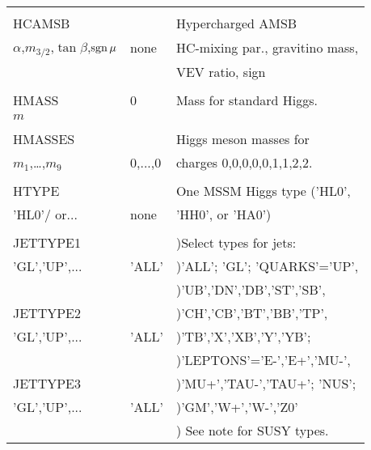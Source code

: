 \begin{center}
\begin{tabular}{lll}
                       &                   &                                \\
HCAMSB                 &                   & Hypercharged AMSB              \\
$\alpha$,$m_{3/2}$,$\tan\beta$,$\mathop{\rm sgn}\mu$ & none & HC-mixing par., gravitino mass, \\
                       &                   & VEV ratio, sign                \\
                       &                   &                                \\
HMASS                  & 0                 & Mass for standard Higgs.       \\
$m$                    &                   &                                \\
                       &                   &                                \\
HMASSES                &                   & Higgs meson masses for         \\
$m_1$,\dots,$m_9$      & 0,...,0           & charges 0,0,0,0,0,1,1,2,2.     \\
                       &                   &                                \\
HTYPE                  &                   & One MSSM Higgs type ('HL0',    \\
'HL0'/ or...           & none              & 'HH0', or 'HA0')               \\
                       &                   &                                \\
JETTYPE1               &                   & )Select types for jets:        \\
'GL','UP',...          & 'ALL'             & )'ALL'; 'GL'; 'QUARKS'='UP',   \\
                       &                   & )'UB','DN','DB','ST','SB',     \\
JETTYPE2               &                   & )'CH','CB','BT','BB','TP',     \\
'GL','UP',...          & 'ALL'             & )'TB','X','XB','Y','YB';       \\
                       &                   & )'LEPTONS'='E-','E+','MU-',    \\
JETTYPE3               &                   & )'MU+','TAU-','TAU+'; 'NUS';   \\
'GL','UP',...          & 'ALL'             & )'GM','W+','W-','Z0'           \\
                       &                   & ) See note for SUSY types.     \\
\hline\hline
\end{tabular}
\end{center}

